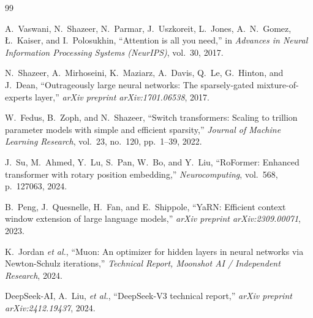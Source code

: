 \documentclass[conference]{IEEEtran}
\begin{document}
\begin{thebibliography}{99}

A.~Vaswani, N.~Shazeer, N.~Parmar, J.~Uszkoreit, L.~Jones, A.~N.~Gomez, {\L}.~Kaiser, and I.~Polosukhin, ``Attention is all you need,'' in \textit{Advances in Neural Information Processing Systems (NeurIPS)}, vol.~30, 2017.

N.~Shazeer, A.~Mirhoseini, K.~Maziarz, A.~Davis, Q.~Le, G.~Hinton, and J.~Dean, ``Outrageously large neural networks: The sparsely-gated mixture-of-experts layer,'' \textit{arXiv preprint arXiv:1701.06538}, 2017.

W.~Fedus, B.~Zoph, and N.~Shazeer, ``Switch transformers: Scaling to trillion parameter models with simple and efficient sparsity,'' \textit{Journal of Machine Learning Research}, vol.~23, no.~120, pp.~1--39, 2022.

J.~Su, M.~Ahmed, Y.~Lu, S.~Pan, W.~Bo, and Y.~Liu, ``RoFormer: Enhanced transformer with rotary position embedding,'' \textit{Neurocomputing}, vol.~568, p.~127063, 2024.

B.~Peng, J.~Quesnelle, H.~Fan, and E.~Shippole, ``YaRN: Efficient context window extension of large language models,'' \textit{arXiv preprint arXiv:2309.00071}, 2023.

K.~Jordan \textit{et al.}, ``Muon: An optimizer for hidden layers in neural networks via Newton-Schulz iterations,'' \textit{Technical Report, Moonshot AI / Independent Research}, 2024.

DeepSeek-AI, A.~Liu, \textit{et al.}, ``DeepSeek-V3 technical report,'' \textit{arXiv preprint arXiv:2412.19437}, 2024.

\end{thebibliography}
\end{document}
